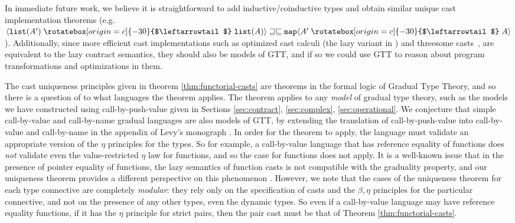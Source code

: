 \documentclass[acmsmall,screen,12pt]{acmart}
\newif\iflong
\newcommand{\ltdyn}{\sqsubseteq}
\newcommand{\gtdyn}{\sqsupseteq}
\newcommand{\equidyn}{\mathrel{\gtdyn\ltdyn}}
\newcommand{\uarrow}{\mathrel{\rotatebox[origin=c]{-30}{$\leftarrowtail$}}}
\newcommand{\upcast}[2]{\langle{#2}\uarrow{#1}\rangle}
\begin{document}
{\fi
In immediate future work, we believe it is straightforward to add
inductive/coinductive types and obtain similar unique cast
implementation theorems
(e.g. $\upcast{\mathtt{list}(A)}{\mathtt{list}(A')} \equidyn
\mathtt{map}\upcast{A}{A'}$).  Additionally, since more efficient cast
implementations such as optimized cast calculi (the lazy variant in
\citet{herman2010spaceefficient}) and threesome
casts~\cite{siekwadler10zigzag}, are equivalent to the lazy contract
semantics, they should also be models of GTT, and if so we could use GTT
to reason about program transformations and optimizations in them.

\iflong
\paragraph{Applicability of Cast Uniqueness Principles}
\fi

The cast uniqueness principles given in theorem
\ref{thm:functorial-casts} are theorems in the formal logic of Gradual
Type Theory, and so there is a question of to what languages the
theorem applies.
%
The theorem applies to any \emph{model} of gradual type theory, such
as the models we have constructed using call-by-push-value given in
Sections \ref{sec:contract}, \ref{sec:complex}, \ref{sec:operational}.
%
We conjecture that simple call-by-value and call-by-name gradual
languages are also models of GTT, by extending the translation of
call-by-push-value into call-by-value and call-by-name in the appendix
of Levy's monograph \cite{levy03cbpvbook}.
%
In order for the theorem to apply, the language must validate an
appropriate version of the $\eta$ principles for the types.
%
So for example, a call-by-value language that has reference equality
of functions does \emph{not} validate even the value-restricted $\eta$
law for functions, and so the case for functions does not apply.
%
It is a well-known issue that in the presence of pointer equality of
functions, the lazy semantics of function casts is not compatible with
the graduality property, and our uniqueness theorem provides a
different perspective on this phenomenon
\cite{findlerflattfelleisen04,chaperonesimpersonators, refined}.
%
However, we note that the cases of the uniqueness theorem for each
type connective are completely \emph{modular}: they rely only on the
specification of casts and the $\beta,\eta$ principles for the
particular connective, and not on the presence of any other types,
even the dynamic types.
%
So even if a call-by-value language may have reference equality
functions, if it has the $\eta$ principle for strict pairs, then the
pair cast must be that of Theorem \ref{thm:functorial-casts}.

}
\end{document}
